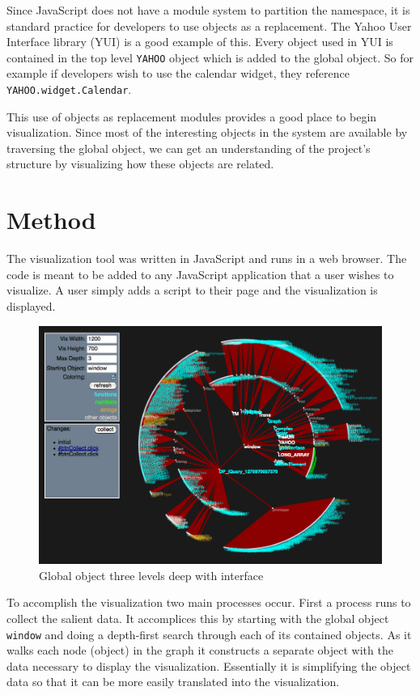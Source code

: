 \documentclass[]{article}
\begin{document}
Since JavaScript does not have a module system to partition the namespace, it is standard practice for developers to use objects as a replacement. The Yahoo User Interface library (YUI) \cite{yui} is a good example of this. Every object used in YUI is contained in the top level {\tt YAHOO} object which is added to the global object. So for example if developers wish to use the calendar widget, they reference {\tt YAHOO.widget.Calendar}.

This use of objects as replacement modules provides a good place to begin visualization. Since most of the interesting objects in the system are available by traversing the global object, we can get an understanding of the project's structure by visualizing how these objects are related.

\section{Method}
\label{sec:method}
The visualization tool was written in JavaScript and runs in a web browser. The code is meant to be added to any JavaScript application that a user wishes to visualize. A user simply adds a script to their page and the visualization is displayed.


\begin{figure}[h]
  \begin{center}
    \includegraphics[scale=.35]{interface.png}
  \end{center}
  \caption{Global object three levels deep with interface}
  \label{fig:interface}
\end{figure}

To accomplish the visualization two main processes occur. First a process runs to collect the salient data. It accomplices this by starting with the global object {\tt window} and doing a depth-first search through each of its contained objects. As it walks each node (object) in the graph it constructs a separate object with the data necessary to display the visualization. Essentially it is simplifying the object data so that it can be more easily translated into the visualization.
\end{document}
